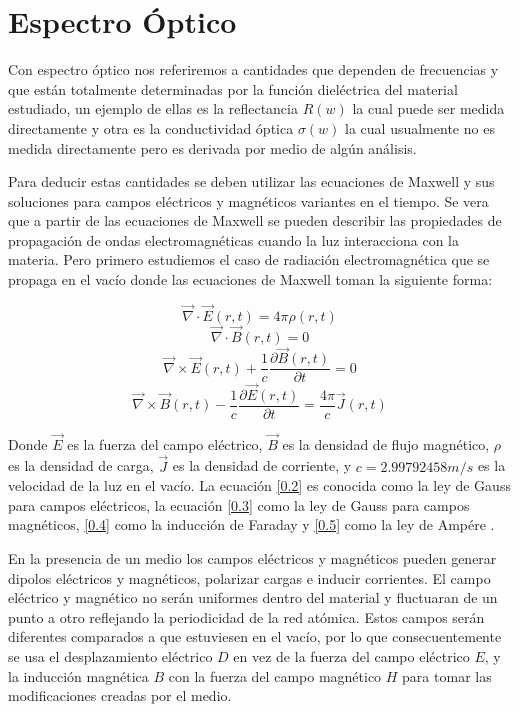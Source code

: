 \documentclass[a4paper,openright,12pt]{book}
\begin{document}
\section{Espectro Óptico}

Con espectro óptico nos referiremos a cantidades que dependen de frecuencias y que están totalmente determinadas por la función dieléctrica del material estudiado, un ejemplo de ellas es la reflectancia $R(w)$ la cual puede ser medida directamente y otra es la conductividad óptica $\sigma(w)$ la cual usualmente no es medida directamente pero es derivada por medio de algún análisis. 

Para deducir estas cantidades se deben utilizar las  ecuaciones de Maxwell y sus  soluciones para campos eléctricos y magnéticos variantes en el tiempo. Se vera que a partir de las ecuaciones de Maxwell se pueden describir las propiedades de propagación de ondas electromagnéticas cuando la luz interacciona con la materia. Pero primero estudiemos el caso de radiación electromagnética que se propaga en el vacío donde las ecuaciones de Maxwell toman la siguiente forma\cite{OpticalTechniques}:

\begin{equation}\label{0.2}
\vec{\nabla}\cdot \vec{E}(r,t)= 4\pi \rho(r,t)
\end{equation}
\begin{equation}\label{0.3}
\vec{\nabla}\cdot \vec{B}(r,t)=0
\end{equation}
\begin{equation}\label{0.4}
\vec{\nabla}\times\vec{E}(r,t)+\frac{1}{c}\frac{\partial\vec{B}(r,t)}{\partial t}=0
\end{equation}
\begin{equation}\label{0.5}
\vec{\nabla}\times\vec{B}(r,t)-\frac{1}{c}\frac{\partial \vec{E}(r,t)}{\partial t}=\frac{4\pi}{c}\vec{J}(r,t)
\end{equation}

Donde $\vec{E}$ es la fuerza del campo eléctrico, $\vec{B}$ es la densidad de flujo magnético, $\rho$ es la densidad de carga, $\vec{J}$ es la densidad de corriente, y $c=2.99792458 m/s$ es la velocidad de la luz en el vacío. La ecuación \ref{0.2} es conocida como la ley de Gauss para campos eléctricos, la ecuación \ref{0.3} como la ley de Gauss para campos magnéticos, \ref{0.4} como la inducción de Faraday y \ref{0.5} como la ley de Ampére \cite{OpticalTechniques}. 

En la presencia de un medio los campos eléctricos y magnéticos pueden generar dipolos eléctricos y magnéticos, polarizar cargas e inducir corrientes. El campo eléctrico y magnético no serán uniformes dentro del material y fluctuaran de un punto a otro reflejando la periodicidad de la red atómica. Estos campos serán diferentes comparados a que estuviesen en el vacío, por lo que consecuentemente se usa el desplazamiento eléctrico $D$ en vez de la fuerza del campo eléctrico $E$, y la inducción magnética $B$  con la fuerza del campo magnético $H$ para tomar las modificaciones creadas por el medio.
\end{document}
